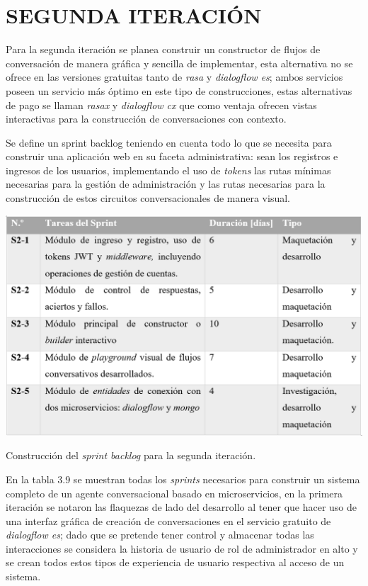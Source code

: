 \documentclass[letter, openright, 12pt]{book}
\begin{document}
\section{SEGUNDA ITERACIÓN}
Para la segunda iteración se planea construir un constructor de flujos de conversación de manera gráfica y sencilla de implementar, esta alternativa no se ofrece en las versiones gratuitas tanto de {\it rasa} y {\it dialogflow es}; ambos servicios poseen un servicio más óptimo en este tipo de construcciones, estas alternativas de pago se llaman {\it rasax} y {\it dialogflow cx} que como ventaja ofrecen vistas interactivas para la construcción de conversaciones con contexto.
\par
Se define un sprint backlog teniendo en cuenta todo lo que se necesita para construir una aplicación web en su faceta administrativa: sean los registros e ingresos de los usuarios, implementando el uso de {\it tokens} las rutas mínimas necesarias para la gestión de administración y las rutas necesarias para la construcción de estos circuitos conversacionales de manera visual. 

\begin{table}[H]
\includegraphics[width=1\textwidth]{tabla3_9}
\caption{Construcción del {\it sprint backlog} para la segunda iteración. } 
\label{tab:tabla3_9} 
\end{table}

En la tabla 3.9 se muestran todas los {\it sprints} necesarios para construir un sistema completo de un agente conversacional basado en microservicios, en la primera iteración se notaron las flaquezas de lado del desarrollo al tener que hacer uso de una interfaz gráfica de creación de conversaciones en el servicio gratuito de {\it dialogflow es}; dado que se pretende tener control y almacenar todas las interacciones se considera la historia de usuario de rol de administrador en alto y se crean todos estos tipos de experiencia de usuario respectiva al acceso de un sistema. 
\end{document}
